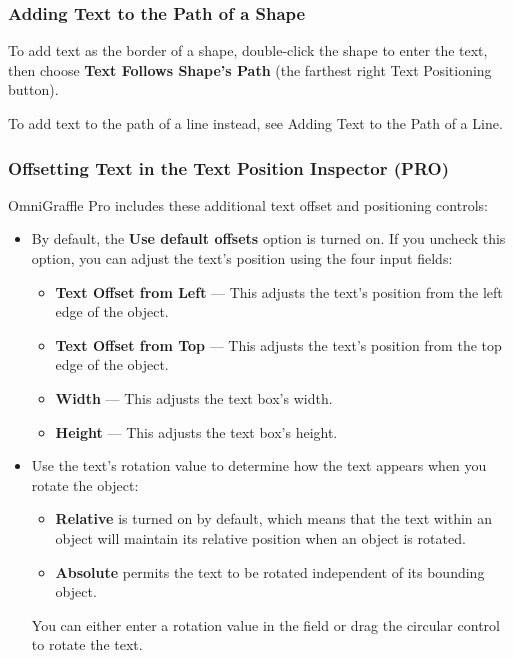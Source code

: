 \documentclass[../main.tex]{subfiles}
\begin{document}
\subsubsection{Adding Text to the Path of a Shape}

To add text as the border of a shape, double-click the shape to enter the text, then choose
\textbf{Text Follows Shape's Path} (the farthest right Text Positioning button).


\begin{ogtip}
  To add text to the path of a line instead, see Adding Text to the Path of a Line.
\end{ogtip}

\subsubsection{Offsetting Text in the Text Position Inspector
(\texorpdfstring{\textbf{PRO}}{PRO})}

\begin{ogpro}
  OmniGraffle Pro includes these additional text offset and positioning controls:

  \begin{itemize}
    \item By default, the \textbf{Use default offsets} option is turned on. If you uncheck this
      option, you can adjust the text's position using the four input fields:

      \begin{itemize}
        \item \textbf{Text Offset from Left} --- This adjusts the text's position from the left
          edge of the object.
        \item \textbf{Text Offset from Top} --- This adjusts the text's position from the top edge
          of the object.
        \item \textbf{Width} --- This adjusts the text box's width.
        \item \textbf{Height} --- This adjusts the text box's height.
      \end{itemize}
    \item Use the text's rotation value to determine how the text appears when you rotate the
      object:

      \begin{itemize}
        \item \textbf{Relative} is turned on by default, which means that the text within an
          object will maintain its relative position when an object is rotated.
        \item \textbf{Absolute} permits the text to be rotated independent of its bounding object.
      \end{itemize}

      You can either enter a rotation value in the field or drag the circular control to rotate
      the text.
  \end{itemize}
\end{ogpro}
\end{document}
